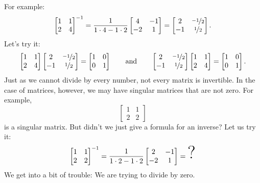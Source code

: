 For example:
\begin{equation*}
\begin{bmatrix}
1 & 1 \\
2 & 4
\end{bmatrix}^{-1}
=
\frac{1}{1\cdot 4-1 \cdot 2}
\begin{bmatrix}
4 & -1 \\
-2 & 1
\end{bmatrix}
=
\begin{bmatrix}
2 & \nicefrac{-1}{2} \\
-1 & \nicefrac{1}{2}
\end{bmatrix} .
\end{equation*}
Let's try it:
\begin{equation*}
\begin{bmatrix}
1 & 1 \\
2 & 4
\end{bmatrix}
\begin{bmatrix}
2 & \nicefrac{-1}{2} \\
-1 & \nicefrac{1}{2}
\end{bmatrix}
=
\begin{bmatrix}
1 & 0 \\
0 & 1
\end{bmatrix}
\qquad
\text{and}
\qquad
\begin{bmatrix}
2 & \nicefrac{-1}{2} \\
-1 & \nicefrac{1}{2}
\end{bmatrix}
\begin{bmatrix}
1 & 1 \\
2 & 4
\end{bmatrix}
=
\begin{bmatrix}
1 & 0 \\
0 & 1
\end{bmatrix} .
\end{equation*}
Just as we cannot divide by every number, not every matrix is
invertible.  In the case of matrices, however, we may have singular
matrices that are not zero.  For example,
\begin{equation*}
\begin{bmatrix}
1 & 1 \\
2 & 2
\end{bmatrix}
\end{equation*}
is a singular matrix.  But didn't we just give a formula for an inverse?
Let us try it:
\begin{equation*}
\begin{bmatrix}
1 & 1 \\
2 & 2
\end{bmatrix}^{-1}
=
\frac{1}{1\cdot 2-1 \cdot 2}
\begin{bmatrix}
2 & -1 \\
-2 & 1
\end{bmatrix}
=
\text{\Huge ?}
\end{equation*}
We get into a bit of trouble:
We are trying to divide by zero.


